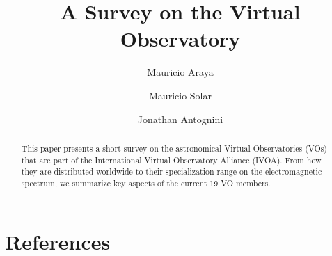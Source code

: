 \documentclass[preprint]{elsarticle}
\begin{document}
\title{A Survey on the Virtual Observatory}

\author[utfsm]{Mauricio Araya}


\author[utfsm]{Mauricio Solar}


\author[utfsm]{Jonathan Antognini}


\address[utfsm]{Universidad T\'ecnica Federico Santa Mar\'ia\\
Avenida Espa\~na 1680, Valpara\'iso, Chile}

\begin{abstract}
This paper presents a short survey on the astronomical Virtual Observatories (VOs) that are 
part of the International Virtual Observatory Alliance (IVOA). From how they are
distributed worldwide to their specialization range on the electromagnetic spectrum, 
we summarize key aspects of the current 19 VO members. 
\end{abstract}

\maketitle
















\section{References}





%



\end{document}
